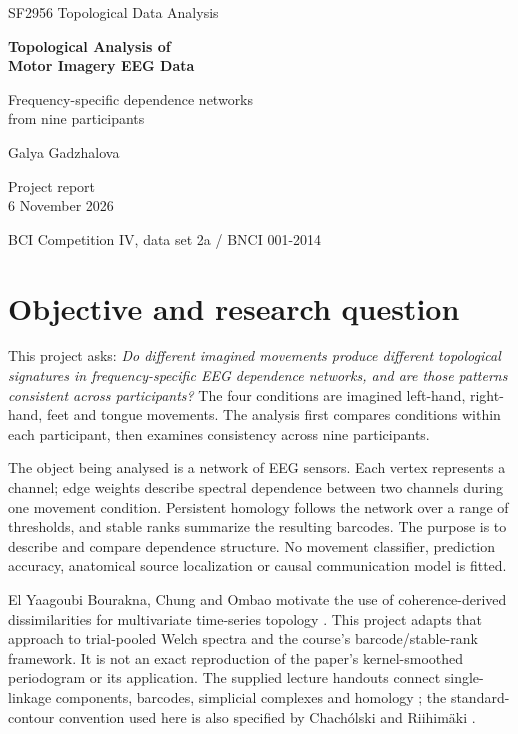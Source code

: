 \documentclass[11pt,a4paper]{article}
\begin{document}
\hypersetup{pageanchor=false}
\begin{titlepage}
\centering
\vspace*{1.6cm}
{\Large SF2956 Topological Data Analysis\par}
\vspace{2.3cm}
{\Huge\bfseries\color{navy} Topological Analysis of\\[0.35cm]Motor Imagery EEG Data\par}
\vspace{1cm}
{\Large Frequency-specific dependence networks\\from nine participants\par}
\vspace{2cm}
{\large Galya Gadzhalova\par}
\vfill
{\large Project report\\6 November 2026\par}
\vspace{1cm}
{\small BCI Competition IV, data set 2a / BNCI 001-2014\par}
\end{titlepage}
\hypersetup{pageanchor=true}
\tableofcontents
\clearpage
{}



\section{Objective and research question}
This project asks: \emph{Do different imagined movements produce different topological signatures in frequency-specific EEG dependence networks, and are those patterns consistent across participants?} The four conditions are imagined left-hand, right-hand, feet and tongue movements. The analysis first compares conditions within each participant, then examines consistency across nine participants.

The object being analysed is a network of EEG sensors. Each vertex represents a channel; edge weights describe spectral dependence between two channels during one movement condition. Persistent homology follows the network over a range of thresholds, and stable ranks summarize the resulting barcodes. The purpose is to describe and compare dependence structure. No movement classifier, prediction accuracy, anatomical source localization or causal communication model is fitted.

El Yaagoubi Bourakna, Chung and Ombao motivate the use of coherence-derived dissimilarities for multivariate time-series topology \cite{bourakna2022}. This project adapts that approach to trial-pooled Welch spectra and the course's barcode/stable-rank framework. It is not an exact reproduction of the paper's kernel-smoothed periodogram or its application. The supplied lecture handouts connect single-linkage components, barcodes, simplicial complexes and homology \cite{lectures}; the standard-contour convention used here is also specified by Chach\'olski and Riihim\"aki \cite{chacholski2020}.
\end{document}
